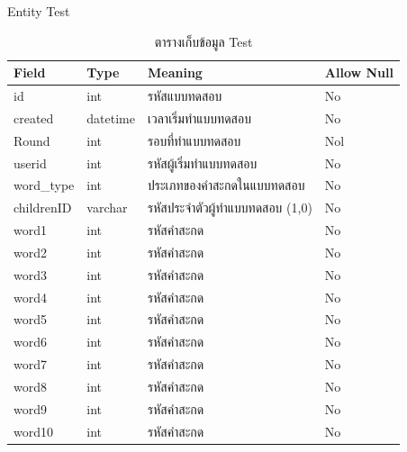 \documentclass[12pt,oneside,openright,a4paper]{cpe-thai-project}
\begin{document}
    Entity Test
    \begin{table}[!h]\centering
      \caption{ตารางเก็บข้อมูล Test}\label{tbl:application1}
      \begin{tabular}{|p{2cm}|p{2cm}|p{7cm}|p{2cm}|} \hline
        Field & Type & Meaning & Allow Null \\ \hline
        id & int & รหัสแบบทดสอบ & No \\ \hline
        created & datetime & เวลาเริ่มทำแบบทดสอบ &No \\ \hline
        Round & int & รอบที่ทำแบบทดสอบ & Nol \\ \hline
        userid & int & รหัสผู้เริ่มทำแบบทดสอบ & No \\ \hline
        word_type & int & ประเภทของคำสะกดในแบบทดสอบ & No \\ \hline
        childrenID & varchar & รหัสประจำตัวผู้ทำแบบทดสอบ (1,0) & No \\ \hline
        word1 & int & รหัสคำสะกด & No \\ \hline
        word2 & int & รหัสคำสะกด & No \\ \hline
        word3 & int & รหัสคำสะกด & No \\ \hline
        word4 & int & รหัสคำสะกด & No \\ \hline
        word5 & int & รหัสคำสะกด & No \\ \hline
        word6 & int & รหัสคำสะกด & No \\ \hline
        word7 & int & รหัสคำสะกด & No \\ \hline
        word8 & int & รหัสคำสะกด & No \\ \hline
        word9 & int & รหัสคำสะกด & No \\ \hline
        word10 & int & รหัสคำสะกด & No \\ \hline
      \end{tabular}
      \end{table}
\end{document}
